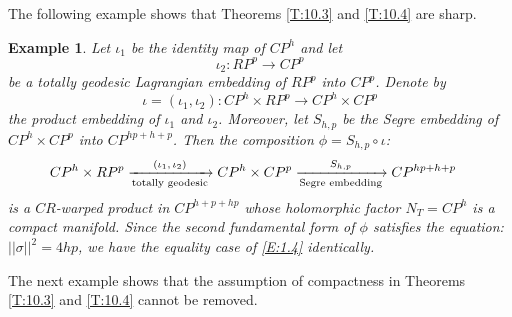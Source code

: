 \documentclass{amsart}
\theoremstyle{plain}
\newtheorem{example}{Example}[section]
\numberwithin{equation}{section}
\theoremstyle{remark}
\numberwithin{equation}{section}
\begin{document}
The following example shows that Theorems \ref{T:10.3} and \ref{T:10.4}  are sharp.

\begin{example} {\rm Let $\iota_1$ be the identity map of $CP^h$ and let $$\iota_2:RP^p\to CP^p$$ be a totally geodesic Lagrangian embedding of $RP^p$ into $CP^p$. Denote by $$\iota=(\iota_1,\iota_2):CP^h\times
RP^p\to CP^h\times CP^p$$ the product embedding of $\iota_1$ and $\iota_2$. 
Moreover, let $S_{h,p}$ be the Segre embedding of  $CP^h\times CP^p$ into $CP^{hp+h+p}$. Then the composition $\phi=S_{h,p}\circ\iota$:
\begin{align}  CP^h &\times RP^p\xrightarrow[\text{totally geodesic}]  {\text{$(\iota_1,\iota_2)$}}  CP^h\times CP^p \xrightarrow[\text{Segre
embedding}] {\text{$S_{h,p}$}} CP^{hp+h+p}\notag\end{align} is a $CR$-warped product in $CP^{h+p+hp}$ whose holomorphic factor $N_T=CP^h$ is a compact manifold. 
 Since the second fundamental form of $\phi$ satisfies the equation: $||\sigma||^2=4hp$, we have the equality case of \eqref{E:1.4} identically. }
\end{example} 
 
The next example shows that the assumption of compactness in Theorems \ref{T:10.3} and \ref{T:10.4} cannot be removed.
\end{document}
